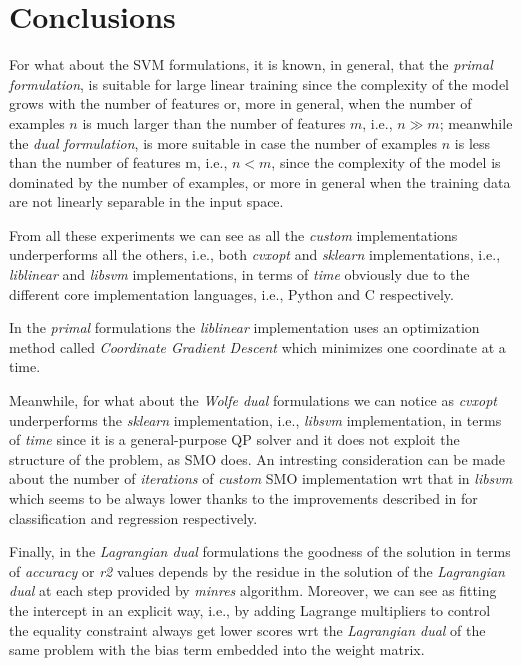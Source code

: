 \section{Conclusions}

For what about the SVM formulations, it is known, in general, that the \emph{primal formulation}, is suitable for large linear training since the complexity of the model grows with the number of features or, more in general, when the number of examples $n$ is much larger than the number of features $m$, i.e., $n \gg m$; meanwhile the \emph{dual formulation}, is more suitable in case the number of examples $n$ is less than the number of features m, i.e., $n < m$, since the complexity of the model is dominated by the number of examples, or more in general when the training data are not linearly separable in the input space.

\bigskip

From all these experiments we can see as all the \emph{custom} implementations underperforms all the others, i.e., both \emph{cvxopt} \cite{vandenberghe2010cvxopt} and \emph{sklearn} implementations, i.e., \emph{liblinear} \cite{fan2008liblinear} and \emph{libsvm} \cite{chang2011libsvm} implementations, in terms of \emph{time} obviously due to the different core implementation languages, i.e., Python and C respectively. 

In the \emph{primal} formulations the \emph{liblinear} \cite{fan2008liblinear} implementation uses an optimization method called \emph{Coordinate Gradient Descent} which minimizes one coordinate at a time.

Meanwhile, for what about the \emph{Wolfe dual} formulations we can notice as \emph{cvxopt} \cite{vandenberghe2010cvxopt} underperforms the \emph{sklearn} implementation, i.e., \emph{libsvm} \cite{chang2011libsvm} implementation, in terms of \emph{time} since it is a general-purpose QP solver and it does not exploit the structure of the problem, as SMO does. An intresting consideration can be made about the number of \emph{iterations} of \emph{custom} SMO implementation wrt that in \emph{libsvm} which seems to be always lower thanks to the improvements described in \cite{keerthi2001improvements, shevade1999improvements} for classification and regression respectively.

Finally, in the \emph{Lagrangian dual} formulations the goodness of the solution in terms of \emph{accuracy} or \emph{r2} values depends by the residue in the solution of the \emph{Lagrangian dual} at each step provided by \emph{minres} algorithm. Moreover, we can see as fitting the intercept in an explicit way, i.e., by adding Lagrange multipliers to control the equality constraint always get lower scores wrt the \emph{Lagrangian dual} of the same problem with the bias term embedded into the weight matrix.


